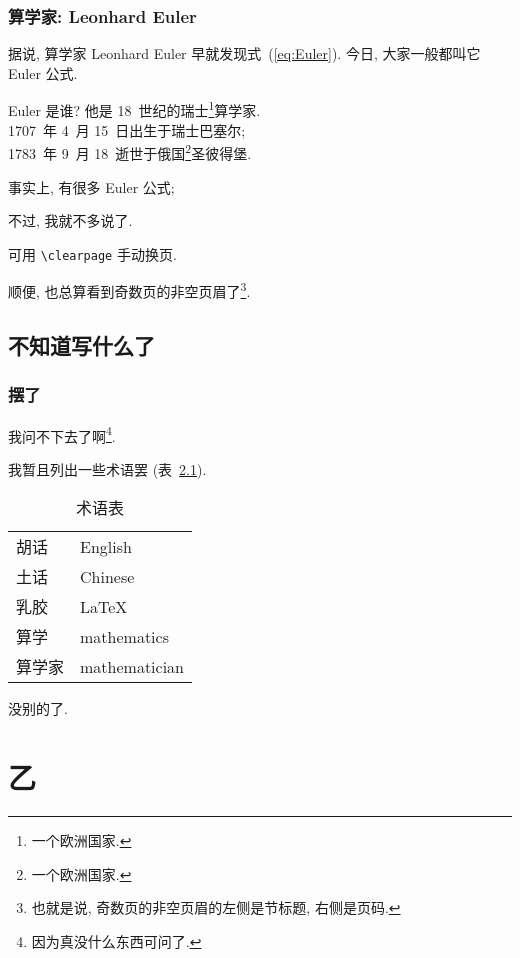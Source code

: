 \documentclass[fontset=fandol]{ctexbook}
\begin{document}
\section{算学家: Leonhard Euler}

据说, 算学家 Leonhard Euler 早就发现式~(\ref{eq:Euler}).
今日, 大家一般都叫它 Euler 公式.

Euler 是谁?
他是 18~世纪的瑞士\footnote{一个欧洲国家.}算学家.\\
1707~年 4~月 15~日出生于瑞士巴塞尔;\\
1783~年 9~月 18~逝世于俄国\footnote{一个欧洲国家.}圣彼得堡.

事实上, 有很多 Euler 公式;\par
不过, 我就不多说了.

\clearpage%

可用 \verb/\clearpage/ 手动换页.

顺便, 也总算看到奇数页的非空页眉了\footnote{也就是说,
    奇数页的非空页眉的左侧是节标题, 右侧是页码.}.

\chapter{不知道写什么了}

\section{摆了}

我问不下去了啊\footnote{因为真没什么东西可问了.}.

我暂且列出一些术语罢 (表~\ref{tab:glossaries}).

\begin{table}[h!]
    \centering
    \caption{术语表}\label{tab:glossaries}
    \begin{tabular}{l l}
        \hline
        胡话   & English       \\
        土话   & Chinese       \\
        乳胶   & \LaTeX{}      \\
        算学   & mathematics   \\
        算学家 & mathematician \\
        \hline
    \end{tabular}
\end{table}

没别的了.

\part{乙}
\end{document}

